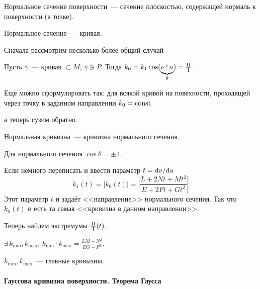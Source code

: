 \documentclass[draft,timbord]{longnotes}
\begin{document}
\begin{defn}\label{defn:meas::curfctr::normsec}
  Нормальное сечение поверхности~--- сечение плоскостью, 
  содержащей нормаль к поверхности (в точке).
\end{defn}

\begin{lem}\label{lem:meas::curfctr::normsec}
  Нормальное сечение~--- кривая.
\end{lem}

Сначала рассмотрим несколько более общий случай

\begin{thrm}[Менье]\label{thrm:meas::curfctr::menie}
  Пусть $\gamma$~--- кривая $ \subset M$, $ \gamma \ni P$.
  Тогда $k_0 = k_1 \cos (\underbrace{\nu \,\text{\^;}\, n}_\theta) = \frac{\rm II}{\rm I} $.
\end{thrm}

\begin{rem}\label{rem:meas::curfctr::menie::ref}
  Ещё можно сформулировать так: для всякой кривой на повехности, проходящей через точку 
  в заданном направлении $k_0 = \rm const$
\end{rem}

а теперь сузим обратно.
\begin{defn}\label{defn:meas::curfctr::normcrvf}
  Нормальная кривизна~--- кривизна нормального сечения.
\end{defn}

Для нормального сечения $\cos\theta = \pm 1$.

Если немного переписать и ввести параметр $t= \mathrm{d} v /\mathrm{d} u $
\[
  k_1(t) = |k_0(t)| = \left|\frac{L + 2Nt + Mt^2}{E + 2Ft +Gt^2} \right|
\]
Этот параметр $t$ и задаёт <<направление>> нормального сечения. 
Так что $k_0(t)$ и есть та самая <<кривизна в данном направлении>>.

Теперь найдем экстремумы $\frac{\rm II}{\rm I} (t)$. 
\begin{thrm}\label{thrm:meas::curfctr::minmax}
  $\exists\, k_{\min}, k_{\max}$, $k_{\min} \cdot k_{\max} = \frac{LM - N^2}{EG - F^2}$.
\end{thrm}

\begin{defn}\label{defn:meas::curfctr::main}
  $k_{\min}, k_{\max}$~--- главные кривызны.
\end{defn}


\paragraph{Гауссова кривизна поверхности. Теорема Гаусса}
\label{par:meas::gauss}
\end{document}
